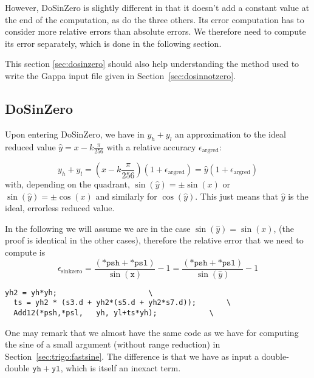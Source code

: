 However, DoSinZero is slightly different in that it doesn't add a
constant value at the end of the computation, as do the three others.
Its error computation has to consider more relative errors than
absolute errors. We therefore need to compute its error separately,
which is done in the following section.

This section \ref{sec:dosinzero} should also help understanding the
method used to write the Gappa input file given in
Section~\ref{sec:dosinnotzero}.



\subsection{DoSinZero \label{sec:dosinzero} }
Upon entering  DoSinZero, we have in
$y_h+y_l$ an approximation to the ideal reduced value
$\hat{y}=x-k\frac{\pi}{256}$ with a relative accuracy $\epsilon_{\mathrm{argred}}$:

\begin{equation}
  y_h+y_l = (x-k\frac{\pi}{256})(1+\epsilon_{\mathrm{argred}})
  = \hat{y}(1+\epsilon_{\mathrm{argred}})
  \label{eq:sinargrederror1}
\end{equation}
with, depending on the quadrant, $\sin(\hat{y}) = \pm\sin(x)$ or
$\sin(\hat{y}) = \pm\cos(x)$ and similarly for $\cos(\hat{y})$. This
just means that $\hat{y}$ is the ideal, errorless reduced value.


In the following we will
assume we are in the case $\sin(\hat{y}) = \sin(x)$, (the proof is
identical in the other cases), therefore the relative error that we need
to compute is
\begin{equation}
  \epsilon_{\mathrm{sinkzero}} = \frac{(\mathtt{*psh} + \mathtt{*psl})}{\sin(\mathtt{x})} -1 = \frac{(\mathtt{*psh} + \mathtt{*psl})}{\sin(\hat{y})} -1
\end{equation}


 \begin{lstlisting}[caption={DoSinZero},firstnumber=1]
  yh2 = yh*yh;					   \
  ts = yh2 * (s3.d + yh2*(s5.d + yh2*s7.d));	   \
  Add12(*psh,*psl,   yh, yl+ts*yh);	           \
\end{lstlisting}

One may remark that we almost have the same code as we have for
computing the sine of a small argument (without range reduction) in
Section~\ref{sec:trigo:fastsine}. The difference is that we have as
input a double-double $\mathtt{yh}+\mathtt{yl}$, which is itself an
inexact term.

